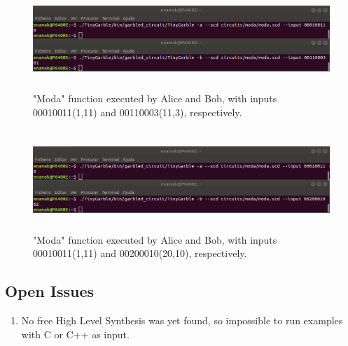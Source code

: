 \begin{refsection}
\begin{figure}[H]
	\centering
	\includegraphics[width=1\textwidth, height=3.8cm]{./sdf/tiny_garble/figures/tinygarble_moda_1.png}
    \caption{"Moda" function executed by Alice and Bob, with inputs 00010011(1,11) and 00110003(11,3), respectively.}\label{fig:tinygarble_moda_1}
\end{figure}

\begin{figure}[H]
	\centering
	\includegraphics[width=1\textwidth, height=3.8cm]{./sdf/tiny_garble/figures/tinygarble_moda_2.png}
    \caption{"Moda" function executed by Alice and Bob, with inputs 00010011(1,11) and 00200010(20,10), respectively.}\label{fig:tinygarble_moda_2}
\end{figure}

\subsection{Open Issues}

\begin{enumerate}  
\item No free High Level Synthesis was yet found, so impossible to run examples with C or C++ as input.
\end{enumerate}

\clearpage
\printbibliography[heading=subbibliography]
\end{refsection}
\cleardoublepage
